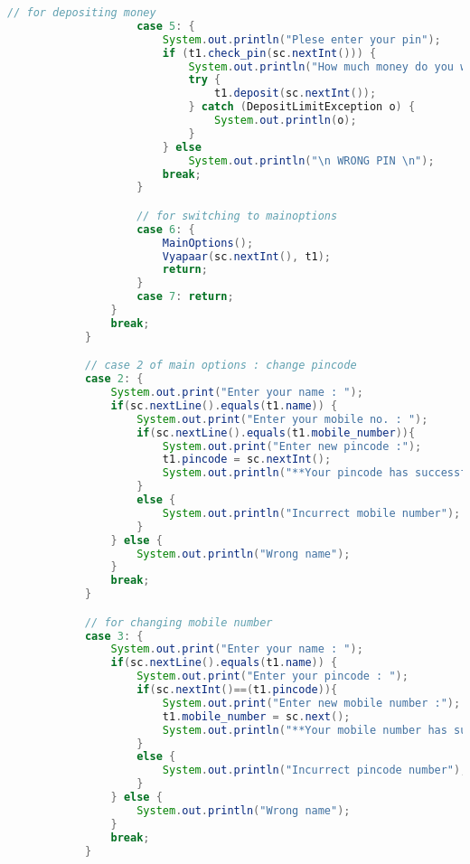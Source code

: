 \documentclass[]{article}
\begin{document}
\begin{lstlisting}[language=java, caption= Java Mini Project ]
                    // for depositing money
                    case 5: {
                        System.out.println("Plese enter your pin");
                        if (t1.check_pin(sc.nextInt())) {
                            System.out.println("How much money do you want to deposit");
                            try {
                                t1.deposit(sc.nextInt());
                            } catch (DepositLimitException o) {
                                System.out.println(o);
                            }
                        } else
                            System.out.println("\n WRONG PIN \n");      
                        break;
                    }

                    // for switching to mainoptions
                    case 6: {
                        MainOptions();
                        Vyapaar(sc.nextInt(), t1);
                        return;
                    }
                    case 7: return;
                }
                break;
            }

            // case 2 of main options : change pincode
            case 2: {
                System.out.print("Enter your name : ");
                if(sc.nextLine().equals(t1.name)) {
                    System.out.print("Enter your mobile no. : ");
                    if(sc.nextLine().equals(t1.mobile_number)){
                        System.out.print("Enter new pincode :");
                        t1.pincode = sc.nextInt();
                        System.out.println("**Your pincode has successfully changed**");
                    }
                    else {
                        System.out.println("Incurrect mobile number");
                    }
                } else {
                    System.out.println("Wrong name");
                }
                break;
            }

            // for changing mobile number
            case 3: {
                System.out.print("Enter your name : ");
                if(sc.nextLine().equals(t1.name)) {
                    System.out.print("Enter your pincode : ");
                    if(sc.nextInt()==(t1.pincode)){
                        System.out.print("Enter new mobile number :");
                        t1.mobile_number = sc.next();
                        System.out.println("**Your mobile number has successfully changed**");
                    }
                    else {
                        System.out.println("Incurrect pincode number");
                    }
                } else {
                    System.out.println("Wrong name");
                }
                break;
            }


\end{lstlisting}
\end{document}
